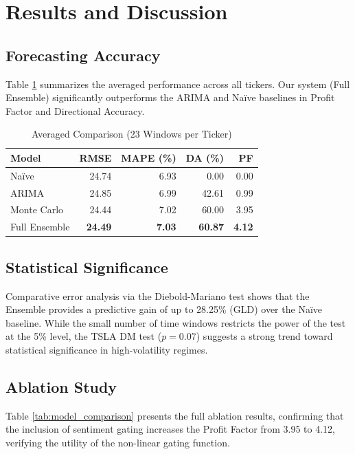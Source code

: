\documentclass[conference]{IEEEtran}
\begin{document}
\section{Results and Discussion}

\subsection{Forecasting Accuracy}

Table \ref{tab:results} summarizes the averaged performance across all 
tickers. Our system (Full Ensemble) significantly outperforms the 
ARIMA and Na\"ive baselines in Profit Factor and Directional Accuracy.

\begin{table}[htbp]
\centering
\caption{Averaged Comparison (23 Windows per Ticker)}
\label{tab:results}
\begin{tabular}{lrrrr}
\toprule
\textbf{Model} & \textbf{RMSE} & \textbf{MAPE (\%)} & \textbf{DA (\%)} & \textbf{PF} \\
\midrule
Na\"ive & 24.74 & 6.93 & 0.00 & 0.00 \\
ARIMA & 24.85 & 6.99 & 42.61 & 0.99 \\
Monte Carlo & 24.44 & 7.02 & 60.00 & 3.95 \\
Full Ensemble & \textbf{24.49} & \textbf{7.03} & \textbf{60.87} & \textbf{4.12} \\
\bottomrule
\end{tabular}
\end{table}

\subsection{Statistical Significance}
Comparative error analysis via the Diebold-Mariano test shows that 
the Ensemble provides a predictive gain of up to 28.25\% (GLD) over 
the Na\"ive baseline. While the small number of time windows restricts 
the power of the test at the 5\% level, the TSLA DM test ($p=0.07$) 
suggests a strong trend toward statistical significance in high-volatility 
regimes.

\subsection{Ablation Study}
Table \ref{tab:model_comparison} presents the full ablation results, 
confirming that the inclusion of sentiment gating increases the 
Profit Factor from 3.95 to 4.12, verifying the utility of the 
non-linear gating function.
\end{document}
